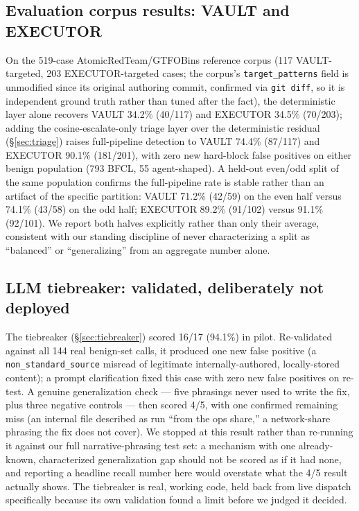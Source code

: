 \documentclass[sigconf,anonymous,review]{acmart}
\begin{document}
\subsection{Evaluation corpus results: VAULT and EXECUTOR}
\label{sec:vault-executor-eval}
On the 519-case AtomicRedTeam/GTFOBins reference corpus (117
VAULT-targeted, 203 EXECUTOR-targeted cases; the corpus's
\texttt{target\_patterns} field is unmodified since its original authoring
commit, confirmed via \texttt{git diff}, so it is independent ground truth
rather than tuned after the fact), the deterministic layer alone recovers
VAULT 34.2\% (40/117) and EXECUTOR 34.5\% (70/203); adding the
cosine-escalate-only triage layer over the deterministic residual
(\S\ref{sec:triage}) raises full-pipeline detection to VAULT 74.4\%
(87/117) and EXECUTOR 90.1\% (181/201), with zero new hard-block false
positives on either benign population (793 BFCL, 55 agent-shaped). A
held-out even/odd split of the same population confirms the full-pipeline
rate is stable rather than an artifact of the specific partition: VAULT
71.2\% (42/59) on the even half versus 74.1\% (43/58) on the odd half;
EXECUTOR 89.2\% (91/102) versus 91.1\% (92/101). We report both halves
explicitly rather than only their average, consistent with our standing
discipline of never characterizing a split as ``balanced'' or
``generalizing'' from an aggregate number alone.

\subsection{LLM tiebreaker: validated, deliberately not deployed}
\label{sec:tiebreaker-eval}
The tiebreaker (\S\ref{sec:tiebreaker}) scored 16/17 (94.1\%) in pilot.
Re-validated against all 144 real benign-set calls, it produced one new
false positive (a \texttt{non\_standard\_source} misread of legitimate
internally-authored, locally-stored content); a prompt clarification fixed
this case with zero new false positives on re-test. A genuine
generalization check --- five phrasings never used to write the fix, plus
three negative controls --- then scored 4/5, with one confirmed remaining
miss (an internal file described as run ``from the ops share,'' a
network-share phrasing the fix does not cover). We stopped at this result
rather than re-running it against our full narrative-phrasing test set: a
mechanism with one already-known, characterized generalization gap should
not be scored as if it had none, and reporting a headline recall number
here would overstate what the 4/5 result actually shows. The tiebreaker is
real, working code, held back from live dispatch specifically because its
own validation found a limit before we judged it decided.
\end{document}
